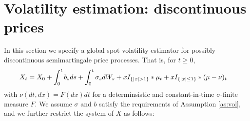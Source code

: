 \section{Volatility estimation: discontinuous prices} 
In this section we specify a global spot volatility estimator for possibly discontinuous \ito semimartingale price processes. That is, for $t \ge 0$,
  \begin{align}
    &X_t = X_0 + \int^t_0 b_s ds + \int^t_0 \sigma_s d W_s  + x  I_{\{\vert x \vert > 1\}} \ast \mu_t  + x  I_{\{\vert x \vert \le  1\}} \ast (\mu - \nu)_t 
  \notag \end{align}
with  $\nu(dt, dx) = F(dx) dt$ for a determinsistic  and constant-in-time $\sigma$-finite measure $F$. We assume $\sigma$ and $b$ satisfy the requirements of Assumption \ref{as:vol}, and we further restrict the \levy system of $X$ as follows:

